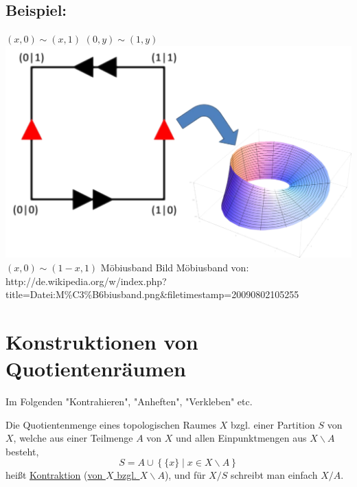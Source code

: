 \documentclass[a4paper,11pt,notitlepage]{report}
\theoremstyle{definition}
\newenvironment{bsp}[1]
{
\setlength{\fboxsep}{10pt}
\subsection*{Beispiel: #1}
\begin{upshape}
}
{
\end{upshape}
}
\newenvironment{definition}[1]{
	\begin{definitions}
	\marginnote{\emph{#1}}
}{\end{definitions}}
\begin{document}
\begin{bsp}{}
	$(x,0) \sim (x,1)$
	\newline
	$(0,y) \sim (1,y)$
	\newline
	\includegraphics[scale=0.6]{images/Quotient_Moebius.png}\newline
	$(x,0) \sim (1-x,1)$
	\newline Möbiusband \newline
	\scriptsize{Bild Möbiusband von:\\ http://de.wikipedia.org/w/index.php?title=Datei:M\%C3\%B6biusband.png\&filetimestamp=20090802105255}
\end{bsp}


\newpage
\section{Konstruktionen von Quotientenräumen}
Im Folgenden "Kontrahieren", "Anheften", "Verkleben" etc.

\begin{definition}{Kontraktion}
	Die Quotientenmenge eines topologischen Raumes $X$ bzgl. einer Partition $S$ von $X$, welche aus einer Teilmenge $A$ von $X$ und allen Einpunktmengen aus $X \backslash A$ besteht, $$S = A \cup \left\{\{x\} \mid x \in X \backslash A\right \}$$
	heißt \underline{Kontraktion} (\underline{von $X$ bzgl. $X \backslash A$}), und für $X/S$ schreibt man einfach $X/A$.
\end{definition}
\end{document}
